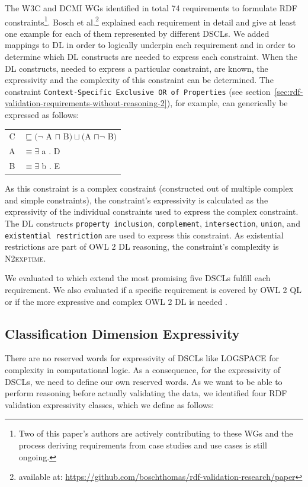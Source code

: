 \documentclass{llncs}
\newcommand{\ms}[1]{\texttt{#1}}
\newenvironment{DL}{
  \scriptsize
  \sffamily
  \vspace{0.3cm}
  \begin{tabular}{r l}

}{
  \end{tabular}
  \linebreak
}
\begin{document}
The W3C and DCMI WGs identified in total 74 requirements to formulate RDF constraints\footnote{Two of this paper's authors are actively contributing to these WGs and the process deriving requirements from case studies and use cases is still ongoing.}.
Bosch et al.\footnote{available at: \url{https://github.com/boschthomas/rdf-validation-research/paper}} explained each requirement in detail and give at least one example for each of them represented by different DSCLs.
We added mappings to DL in order to logically underpin each requirement and in order to determine which DL constructs are needed to express each constraint.
When the DL constructs, needed to express a particular constraint, are known, the expressivity and the complexity of this constraint can be determined. 
The constraint \ms{Context-Specific Exclusive OR of Properties} (see section~\ref{sec:rdf-validation-requirements-without-reasoning-2}), for example, can generically be expressed as follows:
\begin{center}
\begin{DL}
C &$\sqsubseteq (\neg$ A $\sqcap$ B$) \sqcup ($A $\sqcap \neg$ B$)$ \\
A &$\equiv \exists$ a . D \\
B &$\equiv \exists$ b . E  
\end{DL}
\end{center}
As this constraint is a complex constraint (constructed out of multiple complex and simple constraints), 
the constraint's expressivity is calculated as the expressivity of the individual constraints used to express the complex constraint.
The DL constructs \ms{property inclusion}, \ms{complement}, \ms{intersection}, \ms{union}, and \ms{existential restriction} are used to express this constraint.  
As existential restrictions are part of OWL 2 DL reasoning, the constraint's complexity is \textsc{N2exptime}.
 
We evaluated to which extend the most promising five DSCLs fulfill each requirement.
We also evaluated if a specific requirement is covered by OWL 2 QL or if the more expressive and complex OWL 2 DL is needed \cite{BoschNolleAcarEckert2015}.

\subsection{Classification Dimension Expressivity}

There are no reserved words for expressivity of DSCLs like LOGSPACE for complexity in computational logic.
As a consequence, for the expressivity of DSCLs, we need to define our own reserved words.
As we want to be able to perform reasoning before actually validating the data, we identified four RDF validation expressivity classes, 
which we define as follows: 
\end{document}
